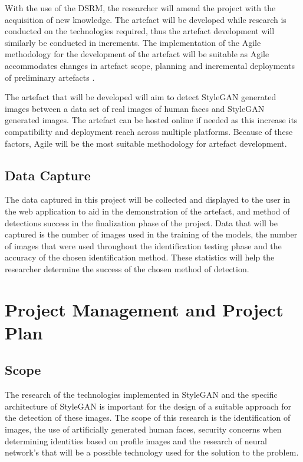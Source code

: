 With the use of the DSRM, the researcher will amend the project with the acquisition of new knowledge. The artefact will be developed while research is conducted on the technologies required, thus the artefact development will similarly be conducted in increments. The implementation of the Agile methodology for the development of the artefact will be suitable as Agile accommodates changes in artefact scope, planning and incremental deployments of preliminary artefacts \citep{Weiyin2011}.

The artefact that will be developed will aim to detect StyleGAN generated images between a data set of real images of human faces and StyleGAN generated images. The artefact can be hosted online if needed as this increase its compatibility and deployment reach across multiple platforms. Because of these factors, Agile will be the most suitable methodology for artefact development. 

\subsection{Data Capture}

The data captured in this project will be collected and displayed to the user in the web application to aid in the demonstration of the artefact, and method of detections success in the finalization phase of the project. Data that will be captured is the number of images used in the training of the models, the number of images that were used throughout the identification testing phase and the accuracy of the chosen identification method. These statistics will help the researcher determine the success of the chosen method of detection.

\section{Project Management and Project Plan}

\subsection{Scope}
The research of the technologies implemented in StyleGAN and the specific architecture of StyleGAN is important for the design of a suitable approach for the detection of these images. The scope of this research is the identification of images, the use of artificially generated human faces, security concerns when determining identities based on profile images and the research of neural network's that will be a possible technology used for the solution to the problem.

